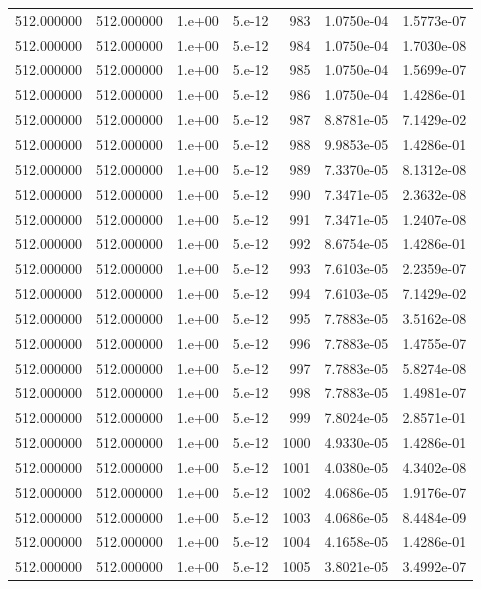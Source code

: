 \begin{table}[htbp]
\begin{tabular}{rrrrrrr}
512.000000 & 512.000000 & 1.e+00 & 5.e-12 & 983 & 1.0750e-04 & 1.5773e-07 \\
512.000000 & 512.000000 & 1.e+00 & 5.e-12 & 984 & 1.0750e-04 & 1.7030e-08 \\
512.000000 & 512.000000 & 1.e+00 & 5.e-12 & 985 & 1.0750e-04 & 1.5699e-07 \\
512.000000 & 512.000000 & 1.e+00 & 5.e-12 & 986 & 1.0750e-04 & 1.4286e-01 \\
512.000000 & 512.000000 & 1.e+00 & 5.e-12 & 987 & 8.8781e-05 & 7.1429e-02 \\
512.000000 & 512.000000 & 1.e+00 & 5.e-12 & 988 & 9.9853e-05 & 1.4286e-01 \\
512.000000 & 512.000000 & 1.e+00 & 5.e-12 & 989 & 7.3370e-05 & 8.1312e-08 \\
512.000000 & 512.000000 & 1.e+00 & 5.e-12 & 990 & 7.3471e-05 & 2.3632e-08 \\
512.000000 & 512.000000 & 1.e+00 & 5.e-12 & 991 & 7.3471e-05 & 1.2407e-08 \\
512.000000 & 512.000000 & 1.e+00 & 5.e-12 & 992 & 8.6754e-05 & 1.4286e-01 \\
512.000000 & 512.000000 & 1.e+00 & 5.e-12 & 993 & 7.6103e-05 & 2.2359e-07 \\
512.000000 & 512.000000 & 1.e+00 & 5.e-12 & 994 & 7.6103e-05 & 7.1429e-02 \\
512.000000 & 512.000000 & 1.e+00 & 5.e-12 & 995 & 7.7883e-05 & 3.5162e-08 \\
512.000000 & 512.000000 & 1.e+00 & 5.e-12 & 996 & 7.7883e-05 & 1.4755e-07 \\
512.000000 & 512.000000 & 1.e+00 & 5.e-12 & 997 & 7.7883e-05 & 5.8274e-08 \\
512.000000 & 512.000000 & 1.e+00 & 5.e-12 & 998 & 7.7883e-05 & 1.4981e-07 \\
512.000000 & 512.000000 & 1.e+00 & 5.e-12 & 999 & 7.8024e-05 & 2.8571e-01 \\
512.000000 & 512.000000 & 1.e+00 & 5.e-12 & 1000 & 4.9330e-05 & 1.4286e-01 \\
512.000000 & 512.000000 & 1.e+00 & 5.e-12 & 1001 & 4.0380e-05 & 4.3402e-08 \\
512.000000 & 512.000000 & 1.e+00 & 5.e-12 & 1002 & 4.0686e-05 & 1.9176e-07 \\
512.000000 & 512.000000 & 1.e+00 & 5.e-12 & 1003 & 4.0686e-05 & 8.4484e-09 \\
512.000000 & 512.000000 & 1.e+00 & 5.e-12 & 1004 & 4.1658e-05 & 1.4286e-01 \\
512.000000 & 512.000000 & 1.e+00 & 5.e-12 & 1005 & 3.8021e-05 & 3.4992e-07 \\

\end{tabular}
\end{table}
